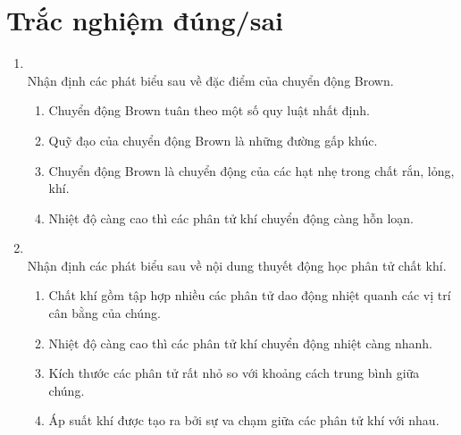 \section{Trắc nghiệm đúng/sai}
\begin{enumerate}[label=\bfseries Câu \arabic*:, leftmargin=1.7cm]
	\item {}\\
	Nhận định các phát biểu sau về đặc điểm của chuyển động Brown.
	\begin{enumerate}[label=\alph*)]
		\item Chuyển động Brown tuân theo một số quy luật nhất định.
		\item Quỹ đạo của chuyển động Brown là những đường gấp khúc.
		\item Chuyển động Brown là chuyển động của các hạt nhẹ trong chất rắn, lỏng, khí.
		\item Nhiệt độ càng cao thì các phân tử khí chuyển động càng hỗn loạn.
	\end{enumerate}
	
	\item {}\\
	Nhận định các phát biểu sau về nội dung thuyết động học phân tử chất khí.
	\begin{enumerate}[label=\alph*)]
		\item Chất khí gồm tập hợp nhiều các phân tử dao động nhiệt quanh các vị trí cân bằng của chúng.
		\item Nhiệt độ càng cao thì các phân tử khí chuyển động nhiệt càng nhanh.
		\item Kích thước các phân tử rất nhỏ so với khoảng cách trung bình giữa chúng.
		\item Áp suất khí được tạo ra bởi sự va chạm giữa các phân tử khí với nhau.
	\end{enumerate}


\end{enumerate}
